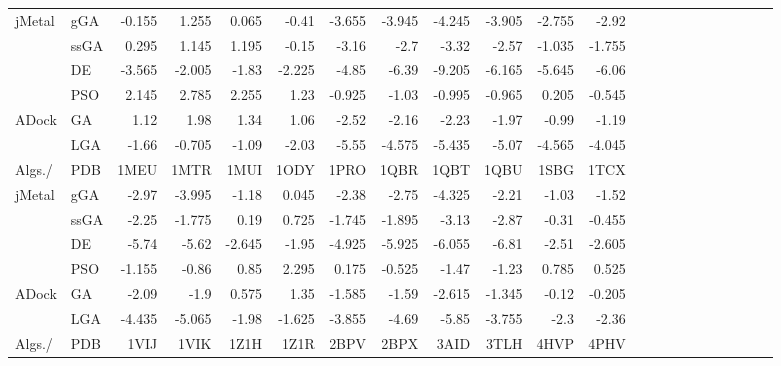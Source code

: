 \begin{table}
\begin{tabular}{ll|rrrrrrrrrrrrrrrrrrrr}
		\multirow{4}{*}{jMetal} &           gGA	 &-0.155&1.255&0.065&-0.41&-3.655&-3.945&-4.245&-3.905&-2.755&-2.92\\
		\multirow{4}{*}{} &           ssGA & 0.295&1.145&1.195&-0.15&-3.16&-2.7&-3.32&-2.57&-1.035&-1.755\\
		\multirow{4}{*}{} &           DE	 &\cellcolor{gray25} -3.565&\cellcolor{gray25}-2.005&\cellcolor{gray25}-1.83&\cellcolor{gray25}-2.225&-4.85&\cellcolor{gray25}-6.39&\cellcolor{gray25}-9.205&\cellcolor{gray25}-6.165&\cellcolor{gray25}-5.645&\cellcolor{gray25}-6.06\\
		\multirow{4}{*}{} &           PSO	 & 2.145&2.785&2.255&1.23&-0.925&-1.03&-0.995&-0.965&0.205&-0.545\\
		\hline
		\multirow{2}{*}{ADock} &           GA	 &1.12&1.98&1.34&1.06&-2.52&-2.16&-2.23&-1.97&-0.99&-1.19\\
		\multirow{2}{*}{} &           LGA  &-1.66&-0.705&-1.09&-2.03&\cellcolor{gray25}-5.55&-4.575&-5.435&-5.07&-4.565&-4.045\\
		\hline
		\hline	
		Algs./ & PDB &1MEU&1MTR&1MUI&1ODY&1PRO&1QBR&1QBT&1QBU&1SBG&1TCX\\
		\hline
		
		\multirow{4}{*}{jMetal} &           gGA	 &-2.97&-3.995&-1.18&0.045&-2.38&-2.75&-4.325&-2.21&-1.03&-1.52\\
		\multirow{4}{*}{} &           ssGA & -2.25&-1.775&0.19&0.725&-1.745&-1.895&-3.13&-2.87&-0.31&-0.455\\
		\multirow{4}{*}{} &           DE	 &\cellcolor{gray25} -5.74&\cellcolor{gray25}-5.62&\cellcolor{gray25}-2.645&\cellcolor{gray25}-1.95&\cellcolor{gray25}-4.925&\cellcolor{gray25}-5.925&\cellcolor{gray25}-6.055&\cellcolor{gray25}-6.81&\cellcolor{gray25}-2.51&\cellcolor{gray25}-2.605\\
		\multirow{4}{*}{} &           PSO	 & -1.155&-0.86&0.85&2.295&0.175&-0.525&-1.47&-1.23&0.785&0.525\\
		\hline
		\multirow{2}{*}{ADock} &           GA	 &-2.09&-1.9&0.575&1.35&-1.585&-1.59&-2.615&-1.345&-0.12&-0.205\\
		\multirow{2}{*}{} &           LGA  &-4.435&-5.065&-1.98&-1.625&-3.855&-4.69&-5.85&-3.755&-2.3&-2.36\\
		\hline
		\hline	
		Algs./ & PDB &1VIJ&1VIK&1Z1H&1Z1R&2BPV&2BPX&3AID&3TLH&4HVP&4PHV\\
		\hline
		

\end{tabular}
\end{table}
